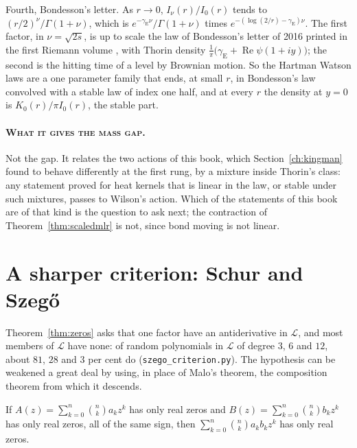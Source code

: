 Fourth, Bondesson's letter. As $r\to0$, $I_\nu(r)/I_0(r)$ tends to $(r/2)^\nu/\Gamma(1+\nu)$, which is $e^{-\gamma_{\mathrm E}\nu}/\Gamma(1+\nu)$ times $e^{-(\log(2/r)-\gamma_{\mathrm E})\nu}$. The first factor, in $\nu=\sqrt{2s}$, is up to scale the law of Bondesson's letter of 2016 printed in the first Riemann volume \cite{PS26a}, with Thorin density $\frac1\pi\big(\gamma_{\mathrm E}+\operatorname{Re}\psi(1+iy)\big)$; the second is the hitting time of a level by Brownian motion. So the Hartman Watson laws are a one parameter family that ends, at small $r$, in Bondesson's law convolved with a stable law of index one half, and at every $r$ the density at $y=0$ is $K_0(r)/\pi I_0(r)$, the stable part.

\paragraph{\normalfont\scshape What it gives the mass gap.} Not the gap. It relates the two actions of this book, which Section~\ref{ch:kingman} found to behave differently at the first rung, by a mixture inside Thorin's class: any statement proved for heat kernels that is linear in the law, or stable under such mixtures, passes to Wilson's action. Which of the statements of this book are of that kind is the question to ask next; the contraction of Theorem~\ref{thm:scaledmlr} is not, since bond moving is not linear.

\section{A sharper criterion: Schur and Szeg\H o}\label{sec:szego}

Theorem~\ref{thm:zeros} asks that one factor have an antiderivative in $\mathcal L$, and most members of $\mathcal L$ have none: of random polynomials in $\mathcal L$ of degree $3$, $6$ and $12$, about $81$, $28$ and $3$ per cent do (\texttt{szego\_criterion.py}). The hypothesis can be weakened a great deal by using, in place of Malo's theorem, the composition theorem from which it descends.

\begin{theorem}\label{thm:schurszego}
If $A(z)=\sum_{k=0}^n\binom nka_kz^k$ has only real zeros and $B(z)=\sum_{k=0}^n\binom nkb_kz^k$ has only real zeros, all of the same sign, then $\sum_{k=0}^n\binom nka_kb_kz^k$ has only real zeros.
\end{theorem}

